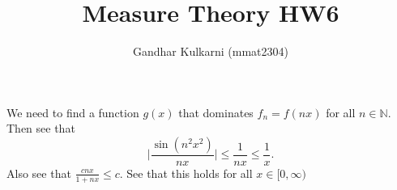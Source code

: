 \documentclass{article}
\title{Measure Theory HW6} %
\author{Gandhar Kulkarni (mmat2304)} %
\date{} %
\begin{document}
\maketitle %


\section{} %

\section{} %

\section{} %
We need to find a function $g(x)$ that dominates $f_n=f(nx)$ for all $n \in \mathbb{N}.$ Then see that $$\mid \frac{\sin(n^2x^2)}{nx}\mid \leq \frac{1}{nx} \leq \frac{1}{x}.$$ Also see that $\frac{cnx}{1+nx}\leq c.$ See that this holds for all $x \in [0,\infty)$

\section{} %

\section{} %

\section{} %

\section{} %

\section{} %

\section{} %

\section{} %

\section{} %
\end{document}

